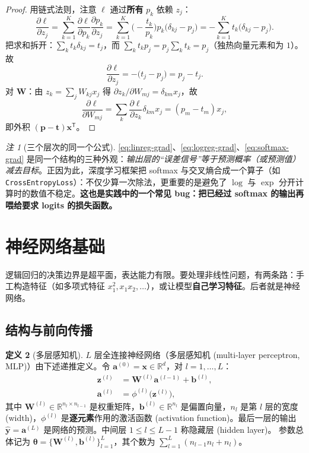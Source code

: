 \documentclass[UTF8,a4paper,11pt]{ctexart}
\theoremstyle{definition}
\newtheorem{definition}{定义}[section]
\theoremstyle{plain}
\theoremstyle{remark}
\newtheorem{remark}[definition]{注}
\newcommand{\R}{\mathbb{R}}
\newcommand{\T}{^{\mathsf{T}}}
\newcommand{\eng}[1]{\textup{(#1)}}
\begin{document}
\begin{proof}
用链式法则，注意 $\ell$ 通过\textbf{所有} $p_k$ 依赖 $z_j$：
\[
  \frac{\partial\ell}{\partial z_j}
  =\sum_{k=1}^{K}\frac{\partial\ell}{\partial p_k}\frac{\partial p_k}{\partial z_j}
  =\sum_{k=1}^{K}\Big(-\frac{t_k}{p_k}\Big)p_k\big(\delta_{kj}-p_j\big)
  =-\sum_{k=1}^{K}t_k\big(\delta_{kj}-p_j\big).
\]
把求和拆开：$\sum_kt_k\delta_{kj}=t_j$，而 $\sum_kt_kp_j=p_j\sum_kt_k=p_j$（独热向量元素和为 $1$）。故
\[
  \frac{\partial\ell}{\partial z_j}=-\big(t_j-p_j\big)=p_j-t_j .
\]
对 $\bm{W}$：由 $z_k=\sum_jW_{kj}x_j$ 得 $\partial z_k/\partial W_{mj}=\delta_{km}x_j$，故
\[
  \frac{\partial\ell}{\partial W_{mj}}=\sum_k\frac{\partial\ell}{\partial z_k}\delta_{km}x_j=(p_m-t_m)x_j,
\]
即外积 $(\bm{p}-\bm{t})\bm{x}\T$。
\end{proof}

\begin{remark}[三个层次的同一个公式]
\eqref{eq:linreg-grad}、\eqref{eq:logreg-grad}、\eqref{eq:softmax-grad} 是同一个结构的三种外观：\emph{输出层的“误差信号”等于预测概率（或预测值）减去目标}。正因为此，深度学习框架把 softmax 与交叉熵合成一个算子（如 \texttt{CrossEntropyLoss}）：不仅少算一次除法，更重要的是避免了 $\log$ 与 $\exp$ 分开计算时的数值不稳定。\textbf{这也是实践中的一个常见 bug：把已经过 softmax 的输出再喂给要求 logits 的损失函数。}
\end{remark}

\section{神经网络基础}\label{sec:nn}

逻辑回归的决策边界是超平面，表达能力有限。要处理非线性问题，有两条路：手工构造特征（如多项式特征 $x_1^2,x_1x_2,\dots$），或让模型\textbf{自己学习特征}。后者就是神经网络。

\subsection{结构与前向传播}

\begin{definition}[多层感知机]\label{def:mlp}
$L$ 层全连接神经网络（多层感知机 \eng{multi-layer perceptron, MLP}）由下述递推定义。令 $\bm{a}^{(0)}=\bm{x}\in\R^{d}$，对 $l=1,\dots,L$：
\begin{align}
  \bm{z}^{(l)}&=\bm{W}^{(l)}\bm{a}^{(l-1)}+\bm{b}^{(l)}, \label{eq:fwd-z}\\
  \bm{a}^{(l)}&=\phi^{(l)}\big(\bm{z}^{(l)}\big), \label{eq:fwd-a}
\end{align}
其中 $\bm{W}^{(l)}\in\R^{n_l\times n_{l-1}}$ 是权重矩阵，$\bm{b}^{(l)}\in\R^{n_l}$ 是偏置向量，$n_l$ 是第 $l$ 层的宽度 \eng{width}，$\phi^{(l)}$ 是\textbf{逐元素}作用的激活函数 \eng{activation function}。最后一层的输出 $\hat{\bm{y}}=\bm{a}^{(L)}$ 是网络的预测。中间层 $1\le l\le L-1$ 称隐藏层 \eng{hidden layer}。
参数总体记为 $\bm{\theta}=\{\bm{W}^{(l)},\bm{b}^{(l)}\}_{l=1}^{L}$，其个数为 $\sum_{l=1}^{L}(n_{l-1}n_l+n_l)$。
\end{definition}
\end{document}
